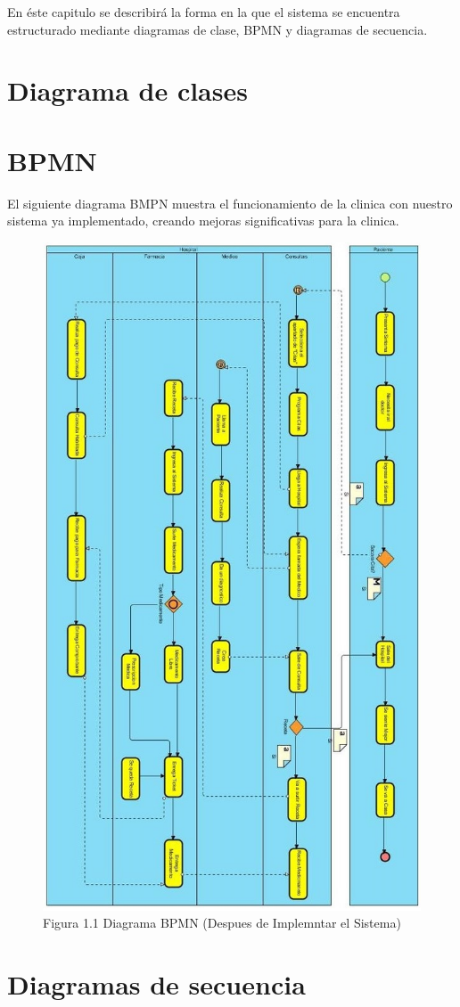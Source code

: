 

En \'este capitulo se describir\'a la forma en la que el sistema se encuentra estructurado mediante diagramas de clase, BPMN y diagramas de secuencia.
\section{Diagrama de clases}
\section{BPMN}
El siguiente diagrama BMPN muestra el funcionamiento de la clinica con nuestro sistema ya implementado, creando mejoras significativas para la clinica.
\begin{figure}[htbp!]
\centering
		\includegraphics[width=.7\textwidth]{images/diagramabpm}
		\caption{Figura 1.1 Diagrama BPMN (Despues de Implemntar el Sistema)}
	\end{figure}
	\newpage

\section{Diagramas de secuencia}
